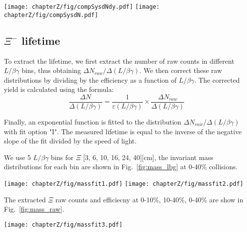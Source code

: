 \begin{figure*}[hbt!]
\texttt{[image: chapterZ/fig/compSysdNdy.pdf]}
\texttt{[image: chapterZ/fig/compSysdN.pdf]}
\caption{Comparison of the rapidity distributions (upper) and integrated cross-section values (bottom) between the default inclusive one $(\eta<0)$ and exclusive one $(\eta<-0.3)$.}
\label{fig:dN_eta}
\end{figure*}

\subsection{$\Xi^{-}$ lifetime}
To extract the lifetime, we first extract the number of raw counts in different $L/\beta\gamma$ bins, thus obtaining $\Delta N_{raw}/\Delta(L/\beta\gamma)$. We then correct these raw distributions by dividing by the efficiency as a function of $L/\beta\gamma$. The corrected yield is calculated using the formula:
\begin{equation}
\frac{\Delta N}{\Delta(L/\beta\gamma)}=\frac{1}{\varepsilon(L/\beta\gamma)}\times \frac{\Delta N_{raw}}{\Delta(L/\beta\gamma)}
\end{equation}

Finally, an exponential function is fitted to the distribution $\Delta N_{raw}/\Delta(L/\beta\gamma)$ with fit option "I". The measured lifetime is equal to the inverse of the negative slope of the fit divided by the speed of light.

We use 5 $L/\beta\gamma$ bins for $\Xi$ [3, 6, 10, 16, 24, 40][cm], the invariant mass distributions for each bin are shown in Fig.~\ref{fig:mass_lbg} at 0-40\% collisions.
\begin{figure*}[hbt!]
\texttt{[image: chapterZ/fig/massfit1.pdf]}
\texttt{[image: chapterZ/fig/massfit2.pdf]}
\caption{Invariant mass of $\Lambda-\pi^{-}$ pairs in different $L/\beta\gamma$ bins at 0-40\% centrality.}
\label{fig:mass_lbg}
\end{figure*}

The extracted $\Xi$ raw counts and efficiecny at 0-10\%, 10-40\%, 0-40\% are show in Fig.~\ref{fig:mass_raw}.
\begin{figure*}[hbt!]
\texttt{[image: chapterZ/fig/massfit3.pdf]}
\caption{Extracted raw counts of $\Lambda-\pi^{-}$ pairs and efficiency as a function of $L/\beta\gamma$ bins at 0-10\%, 10-40\%, 0-40\% centrality.}
\label{fig:mass_raw}
\end{figure*}


